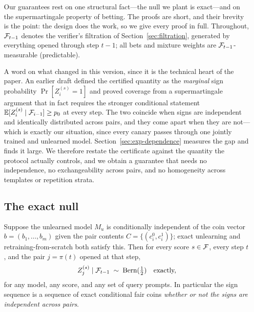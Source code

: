 Our guarantees rest on one structural fact---the null we plant is exact---and on the
supermartingale property of betting. The proofs are short, and their brevity is the
point: the design does the work, so we give every proof in full. Throughout,
$\mathcal{F}_{t-1}$ denotes the verifier's filtration of Section~\ref{sec:filtration},
generated by everything opened through step $t-1$; all bets and mixture weights are
$\mathcal{F}_{t-1}$-measurable (predictable).

A word on what changed in this version, since it is the technical heart of the paper.
An earlier draft defined the certified quantity as the \emph{marginal} sign
probability $\Pr[Z_i^{(s)}=1]$ and proved coverage from a supermartingale argument
that in fact requires the stronger conditional statement
$\mathbb{E}[Z_i^{(s)}\mid\mathcal{F}_{i-1}] \ge p_0$ at every step. The two coincide when signs
are independent and identically distributed across pairs, and they come apart when
they are not---which is exactly our situation, since every canary passes through one
jointly trained and unlearned model. Section~\ref{sec:exp-dependence} measures the
gap and finds it large. We therefore restate the certificate against the quantity the
protocol actually controls, and we obtain a guarantee that needs no independence,
no exchangeability across pairs, and no homogeneity across templates or repetition
strata.

\subsection{The exact null}

\begin{theorem}\label{thm:null}
Suppose the unlearned model $M_u$ is conditionally independent of the coin vector
$b=(b_1,\dots,b_m)$ given the pair contents $C=\{(c_i^0,c_i^1)\}$; exact unlearning
and retraining-from-scratch both satisfy this. Then for every score $s\in\mathcal{F}$, every
step $t$, and the pair $j=\pi(t)$ opened at that step,
\[
Z_j^{(s)} \mid \mathcal{F}_{t-1} \;\sim\; \mathrm{Bern}(\tfrac12) \quad\text{exactly,}
\]
for any model, any score, and any set of query prompts. In particular the sign
sequence is a sequence of exact conditional fair coins \emph{whether or not the signs
are independent across pairs}.
\end{theorem}

